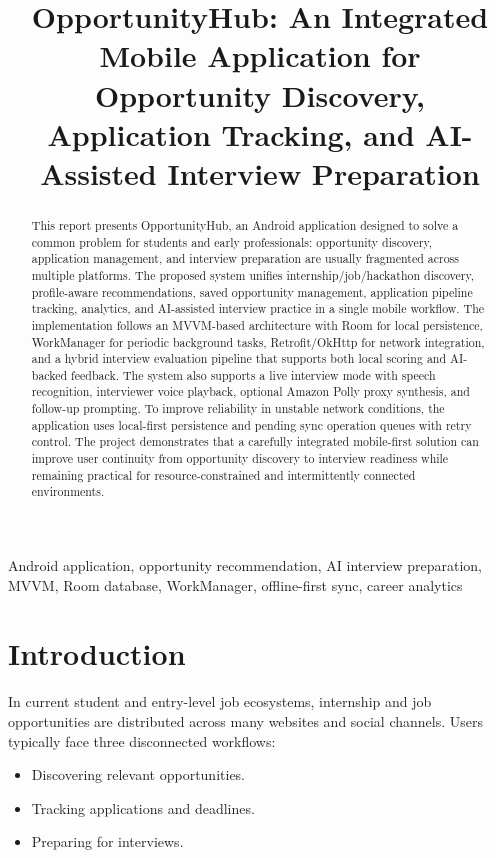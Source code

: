 \documentclass[conference]{IEEEtran}
\title{OpportunityHub: An Integrated Mobile Application for Opportunity Discovery, Application Tracking, and AI-Assisted Interview Preparation}
\author{
\IEEEauthorblockN{Dhruv Maheshwari (230953526) \\
Manas Laxman Kudipady (230953530) \\
Mayur Das (230953414) \\
Priyanshu Sharma (230953520)}
\IEEEauthorblockA{School of Computer Engineering \\
Manipal Institute of Technology, Manipal, India}
}
\begin{document}
\maketitle

\begin{abstract}
This report presents OpportunityHub, an Android application designed to solve a common problem for students and early professionals: opportunity discovery, application management, and interview preparation are usually fragmented across multiple platforms. The proposed system unifies internship/job/hackathon discovery, profile-aware recommendations, saved opportunity management, application pipeline tracking, analytics, and AI-assisted interview practice in a single mobile workflow. The implementation follows an MVVM-based architecture with Room for local persistence, WorkManager for periodic background tasks, Retrofit/OkHttp for network integration, and a hybrid interview evaluation pipeline that supports both local scoring and AI-backed feedback. The system also supports a live interview mode with speech recognition, interviewer voice playback, optional Amazon Polly proxy synthesis, and follow-up prompting. To improve reliability in unstable network conditions, the application uses local-first persistence and pending sync operation queues with retry control. The project demonstrates that a carefully integrated mobile-first solution can improve user continuity from opportunity discovery to interview readiness while remaining practical for resource-constrained and intermittently connected environments.
\end{abstract}

\begin{IEEEkeywords}
Android application, opportunity recommendation, AI interview preparation, MVVM, Room database, WorkManager, offline-first sync, career analytics
\end{IEEEkeywords}

\section{Introduction}

In current student and entry-level job ecosystems, internship and job opportunities are distributed across many websites and social channels. Users typically face three disconnected workflows:

\begin{itemize}
  \item Discovering relevant opportunities.
  \item Tracking applications and deadlines.
  \item Preparing for interviews.
\end{itemize}
\end{document}
